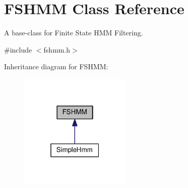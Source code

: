 \hypertarget{classFSHMM}{}\section{F\+S\+H\+MM Class Reference}
\label{classFSHMM}


A base-\/class for Finite State H\+MM Filtering.  




{\ttfamily \#include $<$fshmm.\+h$>$}



Inheritance diagram for F\+S\+H\+MM\+:\nopagebreak
\begin{figure}[H]
\begin{center}
\leavevmode
\includegraphics[width=151pt]{classFSHMM__inherit__graph}
\end{center}
\end{figure}
